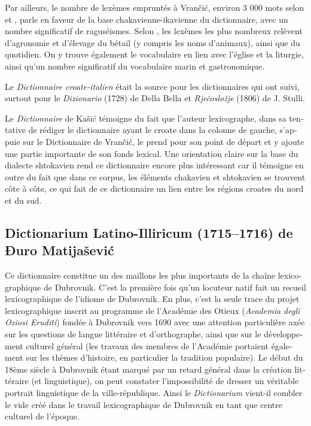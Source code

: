 \documentclass[output=paper,colorlinks,citecolor=brown,arabicfont,chinesefont,booklanguage=french]{langscibook}
\begin{document}
\begin{otherlanguage}{french}
Par ailleurs, le nombre de lexèmes empruntés à Vrančić, environ 3 000 mots selon \citet{Gabric_bagaric1990} et \citet[98]{Horvat1999}, parle en faveur de la base chakavienne-ikavienne du dictionnaire, avec un nombre significatif de raguséismes. Selon \citet{Gabric_bagaric1990}, les lexèmes les plus nombreux relèvent d’agronomie et d’élevage du bétail (y compris les noms d’animaux), ainsi que du quotidien. On y trouve également le vocabulaire en lien avec l’église et la liturgie, ainsi qu’un nombre significatif du vocabulaire marin et gastronomique.

Le \emph{Dictionnaire croate-italien} était la source pour les dictionnaires qui ont suivi, surtout pour le \emph{Dizionario} (1728) de Della Bella et \emph{Rječosložje} (1806) de J. Stulli.  

Le \emph{Dictionnaire} de Kašić témoigne du fait que l’auteur lexicographe, dans sa tentative de rédiger le dictionnaire ayant le croate dans la colonne de gauche, s’appuie sur le Dictionnaire de Vrančić, le prend pour son point de départ et y ajoute une partie importante de son fonds lexical. Une orientation claire sur la base du dialecte shtokavien rend ce dictionnaire encore plus intéressant car il témoigne en outre du fait que dans ce corpus, les éléments chakavien et shtokavien se trouvent côte à côte, ce qui fait de ce dictionnaire un lien entre les régions croates du nord et du sud.

\subsection{Dictionarium Latino-Illiricum (1715--1716) de Đuro Matijašević  }

Ce dictionnaire constitue un des maillons les plus importants de la chaîne lexicographique de Dubrovnik. C’est la première fois qu’un locuteur natif fait un recueil lexicographique de l’idiome de Dubrovnik. En plus, c’est la seule trace du projet lexicographique inscrit au programme de l’Académie des Otieux (\emph{Academia degli Oziosi Eruditi}) fondée à Dubrovnik vers 1690 avec une attention particulière axée sur les questions de langue littéraire et d’orthographe, ainsi que sur le développement culturel général (les travaux des membres de l’Académie portaient également sur les thèmes d’histoire, en particulier la tradition populaire). Le début du 18ème siècle à Dubrovnik étant marqué par un retard général dans la création littéraire (et linguistique), on peut constater l’impossibilité de dresser un véritable portrait linguistique de la ville-république. Ainsi le \emph{Dictionarium} vient-il combler le vide créé dans le travail lexicographique de Dubrovnik en tant que centre culturel de l’époque. 


\end{otherlanguage}
\end{document}
